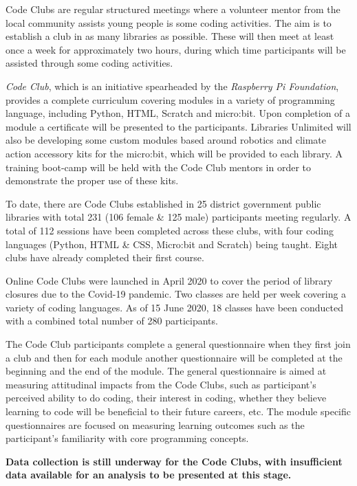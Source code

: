 \documentclass[12pt]{report} %
\begin{document}
Code Clubs are regular structured meetings where a volunteer mentor from the local community assists young people is some coding activities. The aim is to establish a club in as many libraries as possible. These will then meet at least once a week for approximately two hours, during which time participants will be assisted through some coding activities. 

\textit{Code Club}, which is an initiative spearheaded by the \textit{Raspberry Pi Foundation}, provides a complete curriculum covering modules in a variety of programming language, including Python, HTML, Scratch and micro:bit. Upon completion of a module a certificate will be presented to the participants. Libraries Unlimited will also be developing some custom modules based around robotics and climate action accessory kits for the micro:bit, which will be provided to each library. A training boot-camp will be held with the Code Club mentors in order to demonstrate the proper use of these kits.

To date, there are Code Clubs established in 25 district government public libraries with total 231 (106 female \& 125 male) participants meeting regularly. A total of 112 sessions have been completed across these clubs, with four coding languages (Python, HTML \& CSS, Micro:bit and Scratch) being taught. Eight clubs have already completed their first course.

Online Code Clubs were launched in April 2020 to cover the period of library closures due to the Covid-19 pandemic. Two classes are held per week covering a variety of coding languages. As of 15 June 2020, 18 classes have been conducted with a combined total number of 280 participants. 

The Code Club participants complete a general questionnaire when they first join a club and then for each module another questionnaire will be completed at the beginning and the end of the module. The general questionnaire is aimed at measuring attitudinal impacts from the Code Clubs, such as participant's perceived ability to do coding, their interest in coding, whether they believe learning to code will be beneficial to their future careers, etc. The module specific questionnaires are focused on measuring learning outcomes such as the participant's familiarity with core programming concepts. 


\textbf{Data collection is still underway for the Code Clubs, with insufficient data available for an analysis to be presented at this stage. }
\end{document}
